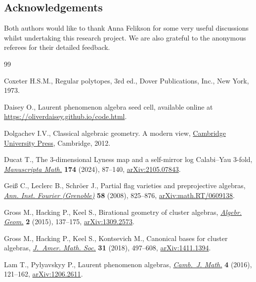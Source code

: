 \documentclass[pdftex]{sigma}
\numberwithin{equation}{section}
\theoremstyle{definition}
\begin{document}
\subsection*{Acknowledgements}

Both authors would like to thank Anna Felikson for some very useful discussions whilst undertaking this research project. We are also grateful to the anonymous referees for their detailed feedback.

\begin{thebibliography}{99}
\footnotesize\itemsep=0pt

Coxeter H.S.M., Regular polytopes, 3rd ed., Dover Publications, Inc., New York,
 1973.

Daisey O., Laurent phenomenon algebra seed cell, available online at
 \url{https://oliverdaisey.github.io/code.html}.

Dolgachev I.V., Classical algebraic geometry. {A} modern view, \href{https://doi.org/10.1017/CBO9781139084437}{Cambridge
 University Press}, Cambridge, 2012.

Ducat T., The 3-dimensional {L}yness map and a self-mirror log {C}alabi--{Y}au
 3-fold, \href{https://doi.org/10.1007/s00229-023-01497-0}{\textit{Manuscripta Math.}} \textbf{174} (2024), 87--140,
 \href{https://arxiv.org/abs/2105.07843}{arXiv:2105.07843}.

Gei{\ss} C., Leclerc B., Schr\"oer J., Partial flag varieties and preprojective
 algebras, \href{https://doi.org/10.5802/aif.2371}{\textit{Ann. Inst. Fourier (Grenoble)}} \textbf{58} (2008),
 825--876, \href{https://arxiv.org/abs/math.RT/0609138}{arXiv:math.RT/0609138}.

Gross M., Hacking P., Keel S., Birational geometry of cluster algebras,
 \href{https://doi.org/10.14231/AG-2015-007}{\textit{Algebr. Geom.}} \textbf{2} (2015), 137--175, \href{https://arxiv.org/abs/1309.2573}{arXiv:1309.2573}.

Gross M., Hacking P., Keel S., Kontsevich M., Canonical bases for cluster
 algebras, \href{https://doi.org/10.1090/jams/890}{\textit{J.~Amer. Math. Soc.}} \textbf{31} (2018), 497--608,
 \href{https://arxiv.org/abs/1411.1394}{arXiv:1411.1394}.

Lam T., Pylyavskyy P., Laurent phenomenon algebras, \href{https://doi.org/10.4310/CJM.2016.v4.n1.a2}{\textit{Camb.~J. Math.}}
 \textbf{4} (2016), 121--162, \href{https://arxiv.org/abs/1206.2611}{arXiv:1206.2611}.


\end{thebibliography}
\end{document}

